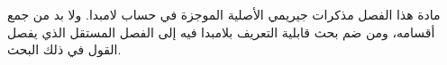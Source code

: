 \documentclass[../../../include/open-logic-chapter]{subfiles}
\begin{document}

\begin{editorial}
مادة هذا الفصل مذكرات جيريمي الأصلية الموجزة في حساب لامبدا.
ولا بد من جمع أقسامه، ومن ضم بحث قابلية التعريف بلامبدا فيه
إلى الفصل المستقل الذي يفصل القول في ذلك البحث.
\end{editorial}














\OLEndChapterHook
\end{document}
